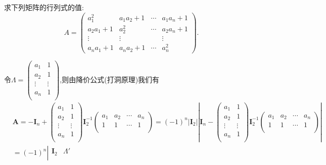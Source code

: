\documentclass[../../main.tex]{subfiles}%
\begin{document}
\begin{example}\label{example:1895}
求下列矩阵的行列式的值:
\[
A = 
\begin{pmatrix}
a_1^2 & a_1a_2 + 1 & \cdots & a_1a_n + 1\\
a_2a_1 + 1 & a_2^2 & \cdots & a_2a_n + 1\\
\vdots & \vdots & & \vdots\\
a_na_1 + 1 & a_na_2 + 1 & \cdots & a_n^2
\end{pmatrix}.
\]
\end{example}
\begin{solution}

令$\boldsymbol{\varLambda }=\left( \begin{matrix}
a_1&		1\\
a_2&		1\\
\vdots&		\vdots\\
a_n&		1\\
\end{matrix} \right)$,则由降价公式(打洞原理)我们有
\begin{align*}
&\boldsymbol{A}=-\boldsymbol{I}_n+\left( \begin{matrix}
a_1&		1\\
a_2&		1\\
\vdots&		\vdots\\
a_n&		1\\
\end{matrix} \right) \boldsymbol{I}_{2}^{-1}\left( \begin{matrix}
a_1&		a_2&		\cdots&		a_n\\
1&		1&		\cdots&		1\\
\end{matrix} \right) =\left( -1 \right) ^n\left| \boldsymbol{I}_2 \right|\left| \boldsymbol{I}_n-\left( \begin{matrix}
a_1&		1\\
a_2&		1\\
\vdots&		\vdots\\
a_n&		1\\
\end{matrix} \right) \boldsymbol{I}_{2}^{-1}\left( \begin{matrix}
a_1&		a_2&		\cdots&		a_n\\
1&		1&		\cdots&		1\\
\end{matrix} \right) \right|
\\
&=\left( -1 \right) ^n\left| \begin{matrix}
\boldsymbol{I}_2&		\boldsymbol{\varLambda }'\\

\end{matrix}
\end{align*}
\end{solution}
\end{document}
